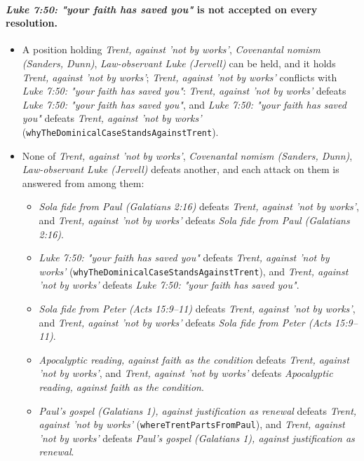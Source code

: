 \documentclass[11pt]{article}
\begin{document}
\paragraph{\emph{Luke 7:50: "your faith has saved you"} is not accepted on every resolution.}
\begin{itemize}
\item A position holding \emph{Trent, against 'not by works'}, \emph{Covenantal nomism (Sanders, Dunn)}, \emph{Law-observant Luke (Jervell)} can be held, and it holds \emph{Trent, against 'not by works'}; \emph{Trent, against 'not by works'} conflicts with \emph{Luke 7:50: "your faith has saved you"}: \emph{Trent, against 'not by works'} defeats \emph{Luke 7:50: "your faith has saved you"}, and \emph{Luke 7:50: "your faith has saved you"} defeats \emph{Trent, against 'not by works'} (\texttt{why\allowbreak{}The\allowbreak{}Dominical\allowbreak{}Case\allowbreak{}Stands\allowbreak{}Against\allowbreak{}Trent}).
\item None of \emph{Trent, against 'not by works'}, \emph{Covenantal nomism (Sanders, Dunn)}, \emph{Law-observant Luke (Jervell)} defeats another, and each attack on them is answered from among them:
\begin{itemize}
\item \emph{Sola fide from Paul (Galatians 2:16)} defeats \emph{Trent, against 'not by works'}, and \emph{Trent, against 'not by works'} defeats \emph{Sola fide from Paul (Galatians 2:16)}.
\item \emph{Luke 7:50: "your faith has saved you"} defeats \emph{Trent, against 'not by works'} (\texttt{why\allowbreak{}The\allowbreak{}Dominical\allowbreak{}Case\allowbreak{}Stands\allowbreak{}Against\allowbreak{}Trent}), and \emph{Trent, against 'not by works'} defeats \emph{Luke 7:50: "your faith has saved you"}.
\item \emph{Sola fide from Peter (Acts 15:9–11)} defeats \emph{Trent, against 'not by works'}, and \emph{Trent, against 'not by works'} defeats \emph{Sola fide from Peter (Acts 15:9–11)}.
\item \emph{Apocalyptic reading, against faith as the condition} defeats \emph{Trent, against 'not by works'}, and \emph{Trent, against 'not by works'} defeats \emph{Apocalyptic reading, against faith as the condition}.
\item \emph{Paul's gospel (Galatians 1), against justification as renewal} defeats \emph{Trent, against 'not by works'} (\texttt{where\allowbreak{}Trent\allowbreak{}Parts\allowbreak{}From\allowbreak{}Paul}), and \emph{Trent, against 'not by works'} defeats \emph{Paul's gospel (Galatians 1), against justification as renewal}.

\end{itemize}
\end{itemize}
\end{document}

